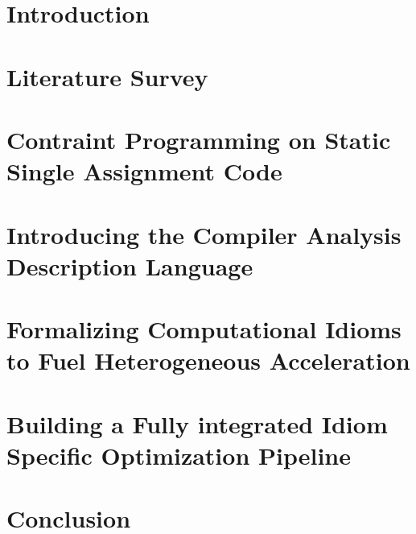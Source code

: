 \documentclass[phd,icsa,twoside,logo,11pt]{infthesis}
\begin{document}
\chapter{Introduction}
    \label{chapter:introduction}
    

\chapter{Literature Survey}
    \label{chapter:literature}
    

\chapter{Contraint Programming on Static Single Assignment Code}
    \label{chapter:theory}
    

\chapter{Introducing the Compiler Analysis Description Language}
    \label{chapter:candl}
    

\chapter{Formalizing Computational Idioms to Fuel Heterogeneous Acceleration}
    \label{chapter:idioms}
    

\chapter{Building a Fully integrated Idiom Specific Optimization Pipeline}
    

\chapter{Conclusion}


\end{document}
